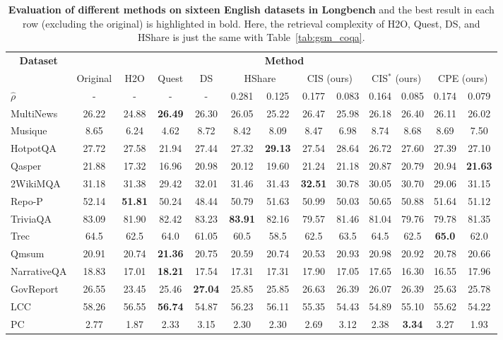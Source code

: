 \begin{table}[t]

\footnotesize
\centering
\caption{\textbf{Evaluation of different methods on sixteen English datasets in Longbench} and the best result in each row (excluding the original) is highlighted in bold. Here, the retrieval complexity of H2O, Quest, DS, and HShare is just the same with Table~\ref{tab:gsm_coqa}.}
\label{tab:longbench}
\begin{tabular}{lcccc|cc|cc|cc|cc}
\toprule
\multicolumn{1}{c}{\multirow{2}{*}{\textbf{Dataset}}} & \multicolumn{12}{c}{\textbf{Method}} \\
\cmidrule(lr){2-13}
 & Original & H2O \cite{zhang2023h2o} & Quest \cite{tang2406quest} & DS \cite{yang2024post} & \multicolumn{2}{c|}{HShare \cite{wuhshare}}  & \multicolumn{2}{c|}{CIS (ours)} & \multicolumn{2}{c|}{CIS$^\ast$ (ours)} & \multicolumn{2}{c}{CPE (ours)}\\
\midrule

$\hat{\rho}$ & - & - & - & - & 0.281 & 0.125 & 0.177 & 0.083 & 0.164 & 0.085 & 0.174 & 0.079\\

\midrule

MultiNews   & 26.22 & 24.88 & \textbf{26.49} & 26.30 & 26.05 & 25.22 & 26.47 & 25.98 & 26.18 & 26.40 & 26.11 & 26.02\\
Musique            & 8.65  & 6.24  & 4.62 & 8.72  & 8.42  & 8.09 & 8.47 & 6.98 & 8.74 & 8.68 & 8.69 & 7.50\\
HotpotQA  & 27.72 & 27.58 & 21.94 & 27.44 & 27.32 & \textbf{29.13} & 27.54 & 28.64 & 26.72 & 27.60 & 27.39 & 27.10\\
Qasper & 21.88 & 17.32 & 16.96 & 20.98 & 20.12 & 19.60 & 21.24 & 21.18 & 20.87 & 20.79 & 20.94 & \textbf{21.63}\\
2WikiMQA  & 31.18 & 31.38 & 29.42 & 32.01 & 31.46 & 31.43 & \textbf{32.51} & 30.78 & 30.05 & 30.70 & 29.06 & 31.15\\
Repo-P & 52.14 & \textbf{51.81} & 50.24 & 48.44 & 50.79 & 51.63 & 50.99 & 50.03 & 50.65 & 50.88 & 51.64 & 51.12\\
TriviaQA  & 83.09 & 81.90 & 82.42 & 83.23 & \textbf{83.91} & 82.16 & 79.57 & 81.46 & 81.04 & 79.76 & 79.78 & 81.35\\
Trec   & 64.5  & 62.5  & 64.0 & 61.05 & 60.5  & 58.5 & 62.5 & 63.5 & 64.5 & 62.5 & \textbf{65.0} & 62.0\\
Qmsum   & 20.91 & 20.74 & \textbf{21.36} & 20.75 & 20.59 & 20.74 & 20.53 & 20.93 & 20.98 & 20.92 & 20.78 & 20.66\\
NarrativeQA  & 18.83 & 17.01 & \textbf{18.21} & 17.54 & 17.31 & 17.31 & 17.90 & 17.05 & 17.65 & 16.30 & 16.55 & 17.96\\
GovReport   & 26.55 & 23.45 & 25.46 & \textbf{27.04} & 25.85 & 25.85 & 26.63 & 26.39 & 26.07 & 26.39 & 25.63 & 25.78\\
LCC    & 58.26 & 56.55 & \textbf{56.74} & 54.87 & 56.23 & 56.11 & 55.35 & 54.43 & 54.89 & 55.10 & 55.62 & 54.22\\
PC      & 2.77  & 1.87  & 2.33 & 3.15 & 2.30  & 2.30 & 2.69 & 3.12 & 2.38 & \textbf{3.34} & 3.27 & 1.93\\


\end{tabular}
\end{table}
